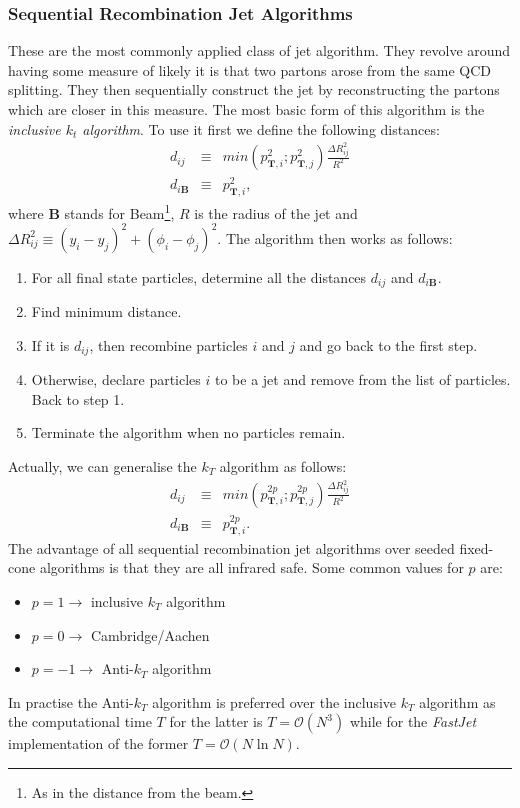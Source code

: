 \documentclass{article}
\begin{document}
\subsubsection{Sequential Recombination Jet Algorithms}
These are the most commonly applied class of jet algorithm. They revolve around having some measure of likely it is that two partons arose from the same QCD splitting. They then sequentially construct the jet by reconstructing the partons which are closer in this measure. The most basic form of this algorithm is the \emph{inclusive $k_{t}$ algorithm}. To use it first we define the following distances:
\begin{eqnarray}
d_{ij} & \equiv & min\left( p^{2}_{\mathbf{T},i};p^{2}_{\mathbf{T},j} \right) \frac{\Delta R_{ij}^{2}}{R^{2}} \\
d_{i \mathbf{B}} & \equiv & p_{\mathbf{T},i}^{2},
\end{eqnarray}
where \textbf{B} stands for Beam\footnote{As in the distance from the beam.}, $R$ is the radius of the jet and $\Delta R_{ij}^{2}  \equiv  \left( y_{i} - y_{j}\right)^{2} + \left( \phi_{i} - \phi_{j} \right) ^{2}$.
The algorithm then works as follows:
\begin{enumerate}
\item For all final state particles, determine all the distances $d_{ij}$ and $d_{i\mathbf{B}}$.
\item Find minimum distance.
\item If it is $d_{ij}$, then recombine particles $i$ and $j$ and go back to the first step.
\item Otherwise, declare particles $i$ to be a jet and remove from the list of particles. Back to step 1.
\item Terminate the algorithm when no particles remain.
\end{enumerate}
Actually, we can generalise the $k_{T}$ algorithm as follows:
\begin{eqnarray}
d_{ij} & \equiv & min\left( p^{2p}_{\mathbf{T},i};p^{2p}_{\mathbf{T},j} \right) \frac{\Delta R_{ij}^{2}}{R^{2}} \\
d_{i \mathbf{B}} & \equiv & p_{\mathbf{T},i}^{2p}.
\end{eqnarray}
The advantage of all sequential recombination jet algorithms over seeded fixed-cone algorithms is that they are all infrared safe. Some common values for $p$ are:
\begin{itemize}
\item $p = 1 \longrightarrow$ inclusive $k_{T}$ algorithm
\item $p = 0 \longrightarrow$ Cambridge/Aachen
\item $p = -1 \longrightarrow$ Anti-$k_{T}$ algorithm
\end{itemize}
In practise the Anti-$k_{T}$ algorithm is preferred over the inclusive $k_{T}$ algorithm as the computational time $T$ for the latter is $T= \mathcal{O}\left(N^{3}\right)$ while for the \emph{FastJet} implementation of the former $T = \mathcal{O}\left(N \ln {N}\right)$.
\end{document}
